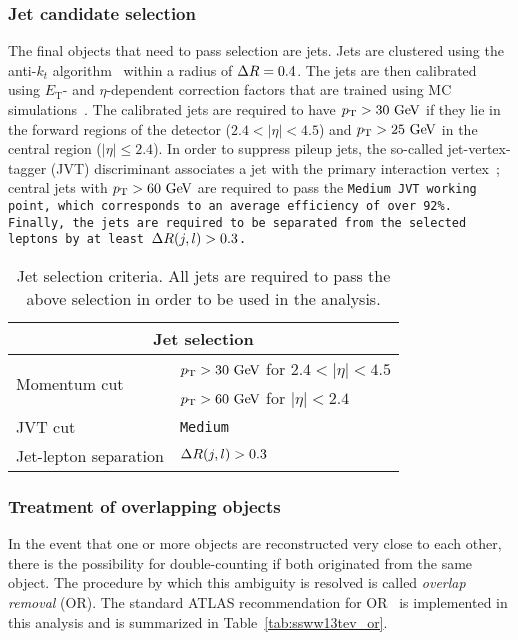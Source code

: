 

\subsubsection{Jet candidate selection}
The final objects that need to pass selection are jets.
Jets are clustered using the anti-$k_t$ algorithm~\cite{2008.antikt} within a radius of $\Delta R = 0.4$.
The jets are then calibrated using $E_\textrm{T}$- and $\eta$-dependent correction factors that are trained using MC simulations~\cite{2017.jet-energy-scale-13tev}.
The calibrated jets are required to have $\pt > 30\gev$ if they lie in the forward regions of the detector ($2.4 < |\eta| < 4.5$) and $\pt > 25\gev$ in the central region ($|\eta| \le 2.4$).
In order to suppress pileup jets, the so-called jet-vertex-tagger (JVT) discriminant associates a jet with the primary interaction vertex~\cite{2014.jet-vertex-tagger}; central jets with $\pt > 60\gev$ are required to pass the \tt{Medium} JVT working point, which corresponds to an average efficiency of over 92\%. %
Finally, the jets are required to be separated from the selected leptons by at least $\Delta R(j,l) > 0.3$.

\begin{table}[htbp]
  \centering
  \begin{tabular}{l l}
    \multicolumn{2}{c}{Jet selection} \\ 
    \hline\hline
    \multirow{2}{*}{Momentum cut} & $\pt > 30\gev$ for $2.4 < |\eta| < 4.5$ \\
                                  & $\pt > 60\gev$ for $|\eta| < 2.4$ \\
    JVT cut                       & \tt{Medium}\\
    Jet-lepton separation         & $\Delta R(j,l) > 0.3$ \\
    \hline
  \end{tabular}
  \caption{Jet selection criteria.  All jets are required to pass the above selection in order to be used in the analysis.}
  \label{tab:ssww13tev_jet_selection}
\end{table}

\subsubsection{Treatment of overlapping objects}\label{ssww13tev:overlap_removal}
In the event that one or more objects are reconstructed very close to each other, there is the possibility for double-counting if both originated from the same object.
The procedure by which this ambiguity is resolved is called \emph{overlap removal} (OR).
The standard ATLAS recommendation for OR~\cite{2014.atlas-overlap-removal, 2018.atlas-wboson-top} is implemented in this analysis and is summarized in Table~\ref{tab:ssww13tev_or}.

